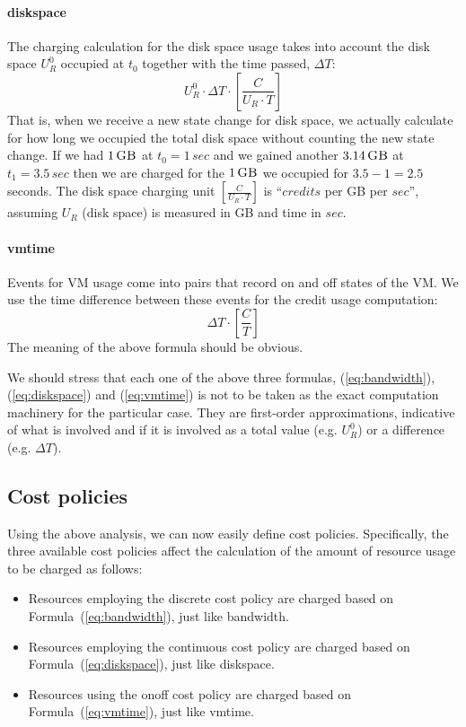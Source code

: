 \documentclass[preprint,10pt]{sigplanconf}
\newcommand{\GB}[1]{\ensuremath{#1\,\mbox{\sc GB}}}
\newcommand{\secs}[1]{\ensuremath{#1\,sec}}
\begin{document}
\paragraph{\textsf{diskspace}}
The charging calculation for the disk space usage takes into account the disk space $U_R^0$ occupied at $t_0$ together with the time passed, $\Delta T$:
\begin{equation}
\label{eq:diskspace}
U_R^{0} \cdot \Delta T \cdot [ \frac{C}{U_R \cdot T} ]
\end{equation}
That is, when we receive a new state change for disk space, we actually calculate for how long we occupied the total disk space without counting the new state change. If we had \GB{1} at $t_0 = \secs{1}$ and we gained another \GB{3.14} at $t_1 = \secs{3.5}$ then we are charged for the \GB{1} we occupied for $3.5 - 1 = 2.5$ seconds. The disk space charging unit $[ \frac{C}{U_R \cdot T} ]$ is ``$credits$ per {\sc GB} per $sec$'', assuming $U_R$ (disk space) is measured in {\sc GB} and time in $sec$.


\paragraph{\textsf{vmtime}}
Events for VM usage come into pairs that record \textsf{on} and \textsf{off} states of the VM. We use the time difference between these events for the credit usage computation:
\begin{equation}
\label{eq:vmtime}
\Delta T \cdot [ \frac{C}{T} ]
\end{equation}
The meaning of the above formula should be obvious.

We should stress that each one of the above three formulas, (\ref{eq:bandwidth}), (\ref{eq:diskspace}) and (\ref{eq:vmtime}) is not to be taken as the exact computation machinery for the particular case. They are first-order approximations, indicative of what is involved and if it is involved as a total value (e.g. $U_R^0$) or a difference (e.g. $\Delta T$).


\subsection{Cost policies}
Using the above analysis, we can now easily define cost policies. Specifically, the three available cost policies affect the calculation 
of the amount of resource usage to be charged as follows:

\begin{itemize}
    \item Resources employing the \textsf{discrete} cost policy  are charged based on Formula~(\ref{eq:bandwidth}), just like \textsf{bandwidth}. 

    \item Resources employing the \textsf{continuous} cost policy are charged based on Formula~(\ref{eq:diskspace}), just like \textsf{diskspace}.

    \item Resources using the \textsf{onoff} cost policy are charged based on Formula~(\ref{eq:vmtime}), just like \textsf{vmtime}.
\end{itemize}
\end{document}
